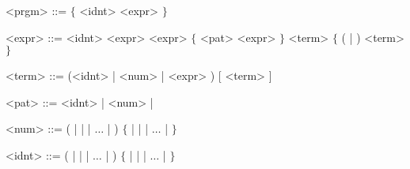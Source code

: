 \documentclass{article}
\theoremstyle{remark} \newtheorem*{solution}{Solution}
\begin{document}
\begin{mdframed}
\begin{grammar}
<prgm> ::= $\{$  <idnt> \lit*{=} <expr> $\}$

<expr> ::=
 <idnt> \lit*{=>} <expr>
\alt {} <expr>  $\{$ \lit*{/} <pat> \lit*{->} <expr> $\}$
\alt <term> $\{$ ( \lit*{+} | \lit*{-} ) <term>$\}$

<term> ::= (<idnt> | <num> | \lit*{(} <expr> \lit*{)}) [ \lit*{\textvisiblespace} <term> ]

<pat> ::= <idnt> | <num> | \lit*{*}

<num> ::= ( |  |  | $\dots$ | ) $\{$  |  |  | $\dots$ |  $\}$

<idnt> ::= ( |  |  | $\dots$ | ) $\{$  |  |  | $\dots$ |  $\}$

\end{grammar}
\end{mdframed}
\end{document}

